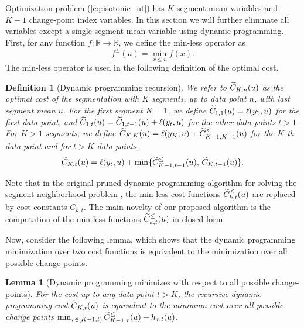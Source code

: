 \documentclass{article}
\newtheorem{lemma}{Lemma}
\newtheorem{definition}{Definition}
\newcommand{\RR}{\mathbb R}
\begin{document}
Optimization problem (\ref{eq:isotonic_ut}) has $K$ segment mean
variables and $K-1$ change-point index variables. In this section we
will further eliminate all variables except a single segment mean
variable using dynamic programming. First, for any function
$f:\RR\rightarrow\RR$, we define the min-less operator as
\begin{equation}
  \label{eq:min-less-def}
  f^\leq(u)=\min_{x\leq u} f(x).
\end{equation}
The min-less operator is used in the following definition of the
optimal cost.
\begin{definition}[Dynamic programming recursion]
\label{def:fcc}
  We refer to $\widetilde{C}_{K,n}(u)$ as the optimal cost of the segmentation
  with $K$ segments, up to data point $n$, with last segment mean
  $u$. For the first segment $K=1$, we define
  $\widetilde{C}_{1,1}(u)=\ell(y_1,u)$ for the first data point, and
  $\widetilde{C}_{1,t}(u)=\widetilde{C}_{1,t-1}(u)+\ell(y_t,u)$ for the other data
  points $t>1$. For $K>1$ segments, we define
  $\widetilde{C}_{K,K}(u)=\ell(y_K, u)+\widetilde{C}_{K-1,K-1}^\leq(u)$ for the $K$-th
  data point and for $t>K$ data points,
  \begin{equation}
\nonumber
  \widetilde{C}_{K,t}(u)=\ell(y_t,u)+
  \min\{
  \widetilde{C}_{K-1,t-1}^\leq(u),\,
  \widetilde{C}_{K,t-1}(u)
  \}.
  \end{equation}
\end{definition}
Note that in the original pruned dynamic programming algorithm for
solving the segment neighborhood problem \citep{pruned-dp}, the
min-less cost functions $\widetilde{C}_{k,t}^\leq(u)$ are replaced by cost
constants $C_{k,t}$. The main novelty of our proposed algorithm is the
computation of the min-less functions $\widetilde{C}_{k,t}^\leq(u)$ in closed
form.

Now, consider the following lemma, which shows that the dynamic
programming minimization over two cost functions is equivalent to the
minimization over all possible change-points.
\begin{lemma}[Dynamic programming minimizes with respect to all possible change-points]
\label{lemma:t_change_points}
  For the cost up to any data point $t> K$, the recursive dynamic
  programming cost $\widetilde{C}_{K,t}(u)$ is equivalent to the minimum cost
  over all possible change points
  $\min_{\tau\in[K-1,t)}\widetilde{C}_{K-1,\tau}^\leq(u)+h_{\tau,t}(u)$.
\end{lemma}
\end{document}
